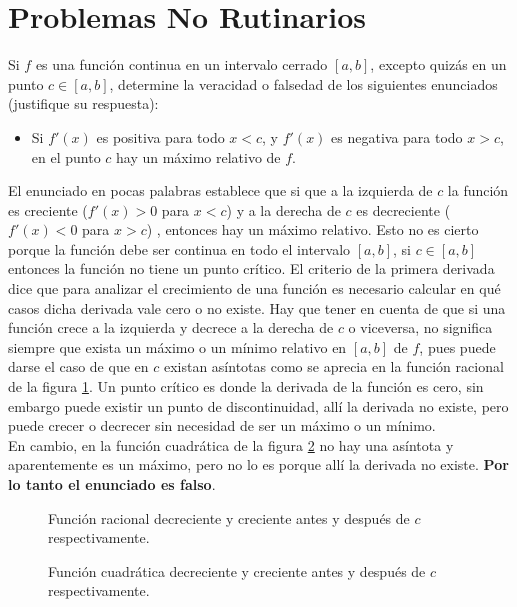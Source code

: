\section{Problemas No Rutinarios}

Si \(f\) es una función continua en un intervalo cerrado \([a, b]\), excepto quizás en un punto \(c\in[a,b]\), determine la veracidad o falsedad de los siguientes enunciados (justifique su respuesta):

\begin{itemize}
    \item Si \(f'(x)\) es positiva para todo \(x<c\), y \(f'(x)\) es negativa para todo \(x>c\), en el punto \(c\) hay un máximo relativo de \(f\).
\end{itemize}

El enunciado en pocas palabras establece que si que a la izquierda de $c$ la función es creciente  ($f'(x) > 0$ para $x < c$) y a la derecha de $c$ es decreciente  ($f'(x) < 0$ para $x > c$) , entonces hay un máximo relativo. Esto no es cierto porque la función debe ser continua en todo el intervalo $[a, b]$, si $c \in [a, b]$ entonces la función no tiene un punto crítico. El criterio de la primera derivada dice que para analizar el crecimiento de una función es necesario calcular en qué casos dicha derivada vale cero o no existe. Hay que tener en cuenta de que si una función crece a la izquierda y decrece a la derecha de $c$ o viceversa, no significa siempre que exista un máximo o un mínimo relativo en $[a, b]$ de $f$, pues puede darse el caso de que en $c$ existan asíntotas como se aprecia en la función racional de la figura \ref{fig:racional1}. Un punto crítico es donde la derivada de la función es cero, sin embargo puede existir un punto de discontinuidad, allí la derivada no existe, pero puede crecer o decrecer sin necesidad de ser un máximo o un mínimo.\\
En cambio, en la función cuadrática de la figura \ref{fig:cuadratica1} no hay una asíntota y aparentemente es un máximo, pero no lo es porque allí la derivada no existe. \textbf{Por lo tanto el enunciado es falso}.

\begin{figure}[H]
    \centering
    
    \caption{Función racional decreciente y creciente antes y después de $c$ respectivamente.}
    \label{fig:racional1}
\end{figure}

\begin{figure}[H]
    \centering
    
    \caption{Función cuadrática decreciente y creciente antes y después de $c$ respectivamente.}
    \label{fig:cuadratica1}
\end{figure}

